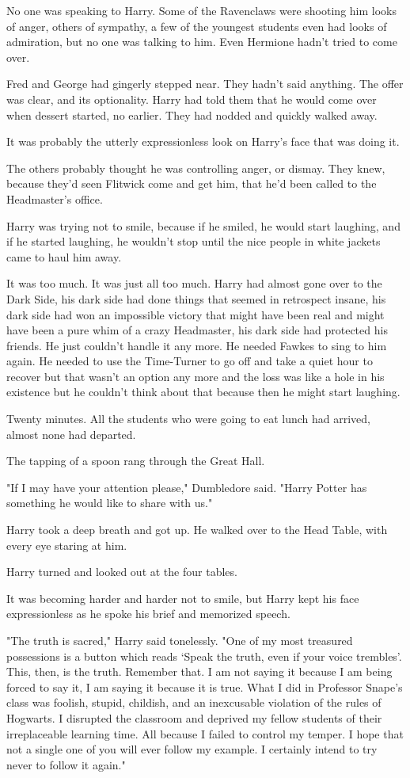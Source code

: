 No one was speaking to Harry. Some of the Ravenclaws were shooting him looks of 
anger, others of sympathy, a few of the youngest students even had looks of 
admiration, but no one was talking to him. Even Hermione hadn't tried to come 
over.

Fred and George had gingerly stepped near. They hadn't said anything. The offer 
was clear, and its optionality. Harry had told them that he would come over 
when dessert started, no earlier. They had nodded and quickly walked away.

It was probably the utterly expressionless look on Harry's face that was doing 
it.

The others probably thought he was controlling anger, or dismay. They knew, 
because they'd seen Flitwick come and get him, that he'd been called to the 
Headmaster's office.

Harry was trying not to smile, because if he smiled, he would start laughing, 
and if he started laughing, he wouldn't stop until the nice people in white 
jackets came to haul him away.

It was too much. It was just all too much. Harry had almost gone over to the 
Dark Side, his dark side had done things that seemed in retrospect insane, his 
dark side had won an impossible victory that might have been real and might 
have been a pure whim of a crazy Headmaster, his dark side had protected his 
friends. He just couldn't handle it any more. He needed Fawkes to sing to him 
again. He needed to use the Time-Turner to go off and take a quiet hour to 
recover but that wasn't an option any more and the loss was like a hole in his 
existence but he couldn't think about that because then he might start laughing.

Twenty minutes. All the students who were going to eat lunch had arrived, 
almost none had departed.

The tapping of a spoon rang through the Great Hall.

"If I may have your attention please," Dumbledore said. "Harry Potter has 
something he would like to share with us."

Harry took a deep breath and got up. He walked over to the Head Table, with 
every eye staring at him.

Harry turned and looked out at the four tables.

It was becoming harder and harder not to smile, but Harry kept his face 
expressionless as he spoke his brief and memorized speech.

"The truth is sacred," Harry said tonelessly. "One of my most treasured 
possessions is a button which reads `Speak the truth, even if your voice 
trembles'. This, then, is the truth. Remember that. I am not saying it because 
I am being forced to say it, I am saying it because it is true. What I did in 
Professor Snape's class was foolish, stupid, childish, and an inexcusable 
violation of the rules of Hogwarts. I disrupted the classroom and deprived my 
fellow students of their irreplaceable learning time. All because I failed to 
control my temper. I hope that not a single one of you will ever follow my 
example. I certainly intend to try never to follow it again."

